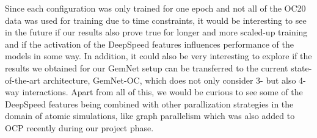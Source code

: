 Since each configuration was only trained for one epoch and not all of the OC20 data was 
used for training due to time constraints, it would be interesting to see in the future if our results 
also prove true for longer and more scaled-up training and if the activation of the DeepSpeed features 
influences performance of the models in some way. 
In addition, it could also be very interesting to explore if the results we obtained for our GemNet setup
can be transferred to the current state-of-the-art architecture, GemNet-OC, which does not only
consider 3- but also 4-way interactions.
Apart from all of this, we would be curious to see some of the DeepSpeed features being
combined with other parallization strategies in the domain of atomic simulations, like 
graph parallelism \cite{https://doi.org/10.48550/arxiv.2203.09697} which was also added to
OCP recently during our project phase.

